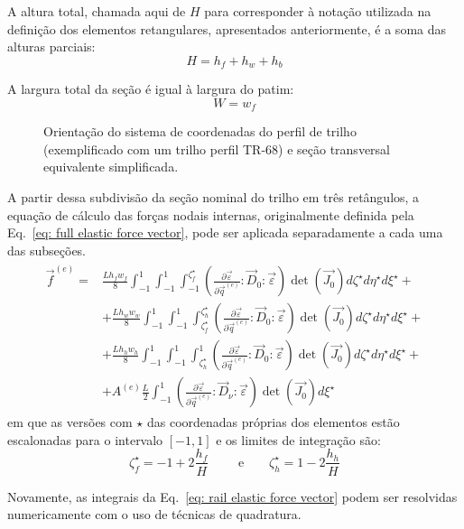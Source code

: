A altura total, chamada aqui de $H$ para corresponder à notação utilizada na definição dos elementos retangulares, apresentados anteriormente,
é a soma das alturas parciais:
\begin{equation}
    H = h_f + h_w + h_b
\end{equation}

A largura total da seção é igual à largura do patim:
\begin{equation}
    W = w_f
\end{equation}

\begin{figure}[h]
    \centering
    
    \caption{Orientação do sistema de coordenadas do perfil de trilho (exemplificado com um trilho perfil TR-68)
    e seção transversal equivalente simplificada.}
    \label{fig:rail coordinate}
\end{figure}

A partir dessa subdivisão da seção nominal do trilho em três retângulos, a equação de cálculo das forças nodais internas, originalmente
definida pela Eq.~\eqref{eq: full elastic force vector}, pode ser aplicada separadamente a cada uma das subseções.
\begin{align}
    \begin{split}
        \vec{f}^{(e)}   =& \frac{L h_f w_f}{8} \int_{-1}^{1}\int_{-1}^{1}\int_{-1}^{\zeta^\star_f}{ \left(\frac{ \partial \vec{\varepsilon}}{\partial \vec{q}^{(e)}} : \vec{D}_0 : \vec{\varepsilon} \right) \det(\vec{J_0}) d\zeta^\star d\eta^\star d\xi^\star} + \\
            & + \frac{L h_w w_w}{8} \int_{-1}^{1}\int_{-1}^{1}\int_{\zeta^\star_f}^{\zeta^\star_h}{ \left(\frac{ \partial \vec{\varepsilon}}{\partial \vec{q}^{(e)}} : \vec{D}_0 : \vec{\varepsilon} \right) \det(\vec{J_0}) d\zeta^\star d\eta^\star d\xi^\star} + \\
            & + \frac{L h_h w_h}{8} \int_{-1}^{1}\int_{-1}^{1}\int_{\zeta^\star_h}^{1}{ \left(\frac{ \partial \vec{\varepsilon}}{\partial \vec{q}^{(e)}} : \vec{D}_0 : \vec{\varepsilon} \right) \det(\vec{J_0}) d\zeta^\star d\eta^\star d\xi^\star} + \\
            & + A^{(e)}\frac{L}{2}\int_{-1}^{1}{ \left(\frac{ \partial \vec{\varepsilon}}{\partial \vec{q}^{(e)}} : \vec{D}_\nu : \vec{\varepsilon} \right) \det(\vec{J_0}) d\xi^\star}
    \end{split}
    \label{eq: rail elastic force vector}
\end{align} 
em que as versões com $\star$ das coordenadas próprias dos elementos estão escalonadas para o intervalo $[-1,1]$ e os limites de integração são:
\begin{equation}
    \zeta^\star_f = -1 + 2\frac{h_f}{H} \qquad\text{ e}\qquad \zeta^\star_h = 1 - 2\frac{h_h}{H}
\end{equation}

Novamente, as integrais da Eq.~\eqref{eq: rail elastic force vector} podem ser resolvidas numericamente com o uso de técnicas de quadratura.